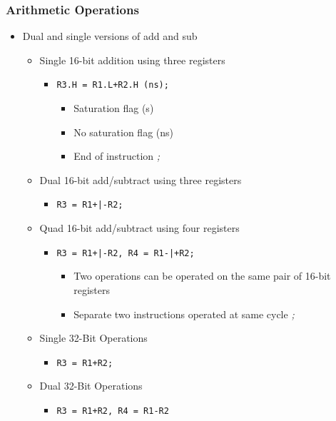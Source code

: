 \subsubsection{Arithmetic Operations}
\begin{itemize}
	\item Dual and single versions of add and sub
	\begin{itemize}
		\item Single 16-bit addition using three registers
		\begin{itemize}
			\item \texttt{R3.H = R1.L+R2.H (ns);}
			\begin{itemize}
				\item Saturation flag (s)
				\item No saturation flag (ns)
				\item End of instruction \textit{;}
			\end{itemize}
		\end{itemize}
		\item Dual 16-bit add/subtract using three registers
		\begin{itemize}
			\item \texttt{R3 = R1+|-R2;}
		\end{itemize}
		\item Quad 16-bit add/subtract using four registers
		\begin{itemize}
			\item \texttt{R3 = R1+|-R2, R4 = R1-|+R2;}
			\begin{itemize}
				\item Two operations can be operated on the same pair of 16-bit registers
				\item Separate two instructions operated at	same cycle \textit{;}
			\end{itemize}
		\end{itemize}
		\item Single 32-Bit Operations
		\begin{itemize}
			\item \texttt{R3 = R1+R2;}
		\end{itemize}
		\item Dual 32-Bit Operations
		\begin{itemize}
			\item \texttt{R3 = R1+R2, R4 = R1-R2}
		\end{itemize}
	\end{itemize}
\end{itemize}

